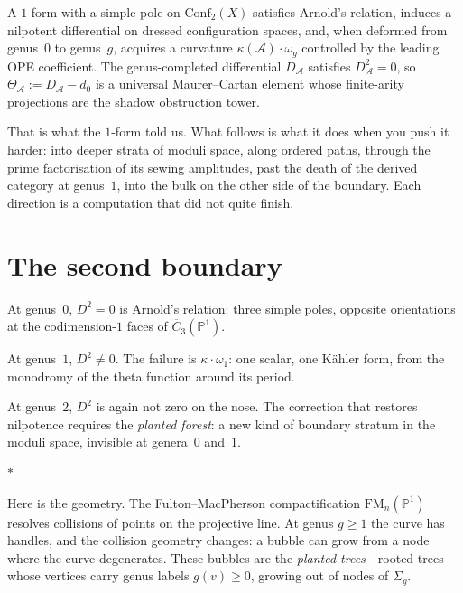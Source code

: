 \documentclass[11pt]{article}
\newcommand{\cA}{\mathcal{A}}
\newcommand{\bP}{\mathbb{P}}
\newcommand{\FM}{\mathrm{FM}}
\newcommand{\sep}{\bigskip\begin{center}$*$\end{center}\medskip}
\begin{document}
A $1$-form with a simple pole on $\mathrm{Conf}_2(X)$ satisfies
Arnold's relation, induces a nilpotent differential on dressed
configuration spaces, and, when deformed from genus~$0$ to
genus~$g$, acquires a curvature $\kappa(\cA) \cdot \omega_g$
controlled by the leading OPE coefficient.  The genus-completed
differential $D_\cA$ satisfies $D_\cA^2 = 0$, so
$\Theta_\cA := D_\cA - d_0$ is a universal Maurer--Cartan
element whose finite-arity projections are the shadow obstruction
tower.

That is what the $1$-form told us.  What follows is what it
does when you push it harder: into deeper strata of moduli
space, along ordered paths, through the prime factorisation of
its sewing amplitudes, past the death of the derived category
at genus~$1$, into the bulk on the other side of the boundary.
Each direction is a computation that did not quite finish.


\section{The second boundary}
\label{sec:second-boundary}

At genus~$0$, $D^2 = 0$ is Arnold's relation: three simple
poles, opposite orientations at the codimension-$1$ faces of
$\overline{C}_3(\bP^1)$.

At genus~$1$, $D^2 \neq 0$.  The failure is
$\kappa \cdot \omega_1$: one scalar, one K\"ahler form,
from the monodromy of the theta function around its period.

At genus~$2$, $D^2$ is again not zero on the nose.  The
correction that restores nilpotence requires the
\textit{planted forest}: a new kind of boundary stratum in the
moduli space, invisible at genera~$0$ and~$1$.

\sep

Here is the geometry.  The Fulton--MacPherson compactification
$\FM_n(\bP^1)$ resolves collisions of points on the projective
line.  At genus $g \geq 1$ the curve has handles, and the
collision geometry changes: a bubble can grow from a node
where the curve degenerates.  These bubbles are the
\textit{planted trees}---rooted trees whose vertices carry
genus labels $g(v) \geq 0$, growing out of nodes of $\Sigma_g$.
\end{document}
